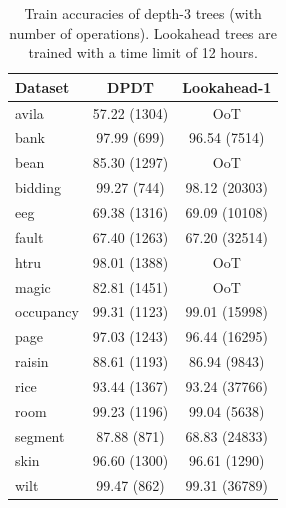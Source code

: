 \begin{table}
\caption{Train accuracies of depth-3 trees (with number of operations). Lookahead trees are trained with a time limit of 12 hours.}
\centering
\begin{tabular}{l|c|c}
\toprule
\textbf{Dataset} & \textbf{DPDT} & \textbf{Lookahead-1} \\
\midrule
avila & 57.22 (1304) & OoT \\
bank & 97.99 (699) & 96.54 (7514) \\
bean & 85.30 (1297) & OoT \\
bidding & 99.27 (744) & 98.12 (20303) \\
eeg & 69.38 (1316) & 69.09 (10108) \\
fault & 67.40 (1263) & 67.20 (32514) \\
htru & 98.01 (1388) & OoT \\
magic & 82.81 (1451) & OoT \\
occupancy & 99.31 (1123) & 99.01 (15998) \\
page & 97.03 (1243) & 96.44 (16295) \\
raisin & 88.61 (1193) & 86.94 (9843) \\
rice & 93.44 (1367) & 93.24 (37766) \\
room & 99.23 (1196) & 99.04 (5638) \\
segment & 87.88 (871) & 68.83 (24833) \\
skin & 96.60 (1300) & 96.61 (1290) \\
wilt & 99.47 (862) & 99.31 (36789) \\
\bottomrule
\end{tabular}
\label{tab:lookahead}
\end{table}

